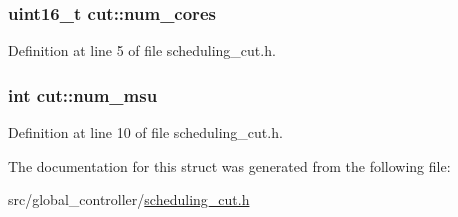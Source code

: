 \hypertarget{structcut_a698d9917bec501d6a3f14cba141b03ae}{
\subsubsection[{num\-\_\-cores}]{\setlength{\rightskip}{0pt plus 5cm}uint16\-\_\-t cut\-::num\-\_\-cores}}\label{structcut_a698d9917bec501d6a3f14cba141b03ae}


Definition at line 5 of file scheduling\-\_\-cut.\-h.

\hypertarget{structcut_ae96cd38e08c0b4514e75210a12ee17ae}{
\subsubsection[{num\-\_\-msu}]{\setlength{\rightskip}{0pt plus 5cm}int cut\-::num\-\_\-msu}}\label{structcut_ae96cd38e08c0b4514e75210a12ee17ae}


Definition at line 10 of file scheduling\-\_\-cut.\-h.



The documentation for this struct was generated from the following file\-:\begin{DoxyCompactItemize}
\item 
src/global\-\_\-controller/\hyperlink{scheduling__cut_8h}{scheduling\-\_\-cut.\-h}\end{DoxyCompactItemize}
